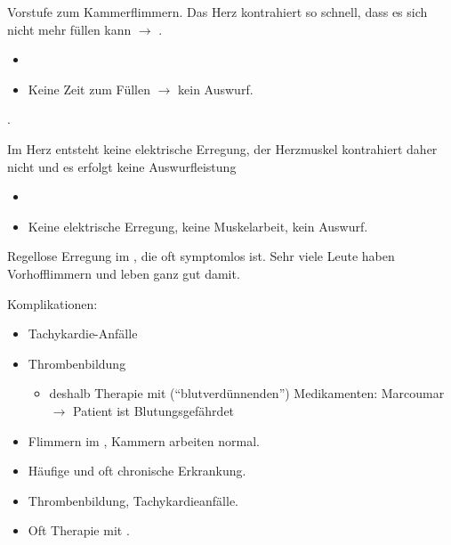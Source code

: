     
{ 
%
Vorstufe zum Kammerflimmern. Das Herz kontrahiert
so schnell, dass es sich nicht mehr füllen kann
${\rightarrow}$ .
}
{
\begin{itemize}
  \item  {}
  \item Keine Zeit zum Füllen ${\rightarrow}$ kein Auswurf.
\end{itemize}

}




{. 



Im Herz entsteht keine elektrische
Erregung, der Herzmuskel kontrahiert daher nicht und es erfolgt
{keine Auswurfleistung} 
}{
\begin{itemize}
  \item {}
  \item Keine elektrische Erregung, keine Muskelarbeit, kein Auswurf.
\end{itemize}
}{}{}{}
    
{

Regellose Erregung im , die oft symptomlos ist. 
Sehr viele Leute haben Vorhofflimmern und leben ganz gut damit.

Komplikationen:
\begin{itemize}
  \item Tachykardie-Anfälle
  \item Thrombenbildung
  \begin{itemize}
    \item deshalb Therapie mit 
    ("`blutverdünnenden"') Medikamenten:
    Marcoumar ${\rightarrow}$ Patient ist Blutungsgefährdet
  \end{itemize}
\end{itemize}
}
{
\begin{itemize}
  \item Flimmern im , Kammern arbeiten normal.
  \item Häufige und oft chronische Erkrankung.
  \item Thrombenbildung, Tachykardieanfälle.
  \item Oft Therapie mit .
\end{itemize}

}{}{}{}



